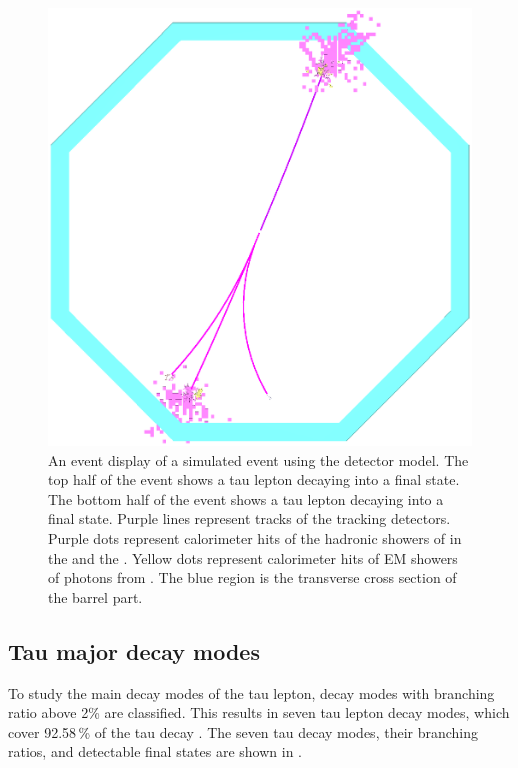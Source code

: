 \begin{figure}[!tbph]
\centering
\includegraphics[width=1\textwidth]{tau/tau_evt_dsp2}
\caption{ An event display of a simulated \eeToTauTau event using the \ILD detector model. The top half of the event shows a tau lepton decaying into a \decayRhoFinalState final state. The bottom half of the event shows a tau lepton decaying into a \decayThreePionPhoton final state. Purple lines represent \Ppipm tracks of the tracking detectors. Purple dots represent  calorimeter hits of the hadronic showers of \Ppipm in the \ECAL and the \HCAL. Yellow dots represent calorimeter hits of EM showers of photons  from \HepProcess{\Ppizero \to \Pphoton \Pphoton}. The blue region is the transverse cross section of the \ECAL barrel part.}
\label{fig:tauEvtDsp}
\end{figure}




\subsection{Tau major decay modes}

To study the main decay modes of the tau lepton, decay modes with branching ratio above 2\% are classified. This results in seven tau lepton decay modes, which cover 92.58\,\% of the tau decay \cite{Agashe:2014kda}. The seven tau decay modes, their branching ratios, and detectable final states are  shown in .



